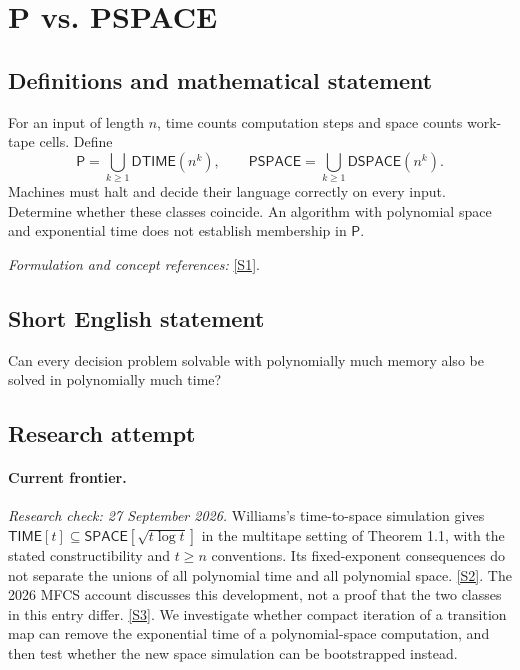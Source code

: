\documentclass[11pt,a4paper]{article}
\newcommand{\sref}[2]{\hyperlink{source:#1:#2}{[S#2]}}
\newif\ifshowcatalogue
\newcommand{\cataloguescope}[1]{\ifshowcatalogue
 \paragraph{Exact scope in the supplied catalogue.}
 \begin{quote}\small #1\end{quote}\fi}
\begin{document}
\setcounter{section}{0}
\clearpage
\section*{\texorpdfstring{P vs. PSPACE}{P vs. PSPACE}}\label{3402}
\subsection{Definitions and mathematical statement}
For an input of length $n$, time counts computation steps and space counts work-tape cells. Define
\[
 \mathsf P=\bigcup_{k\ge1}\mathsf{DTIME}(n^k),\qquad
 \mathsf{PSPACE}=\bigcup_{k\ge1}\mathsf{DSPACE}(n^k).
\]
Machines must halt and decide their language correctly on every input. Determine whether these classes coincide. An algorithm with polynomial space and exponential time does not establish membership in $\mathsf P$.
\par\smallskip\textit{Formulation and concept references:} \sref{3402}{1}.
\cataloguescope{Determine whether P = PSPACE, that is, whether every language decidable by a deterministic Turing machine in polynomial space is decidable by a deterministic Turing machine in polynomial time.}
\subsection{Short English statement}
Can every decision problem solvable with polynomially much memory also be solved in polynomially much time?
\subsection{Research attempt}
\paragraph{Current frontier.}
\textit{Research check: 27 September 2026.}
Williams's time-to-space simulation gives
$\mathsf{TIME}[t]\subseteq\mathsf{SPACE}[\sqrt{t\log t}]$ in the
multitape setting of Theorem 1.1, with the stated constructibility and
$t\geq n$ conventions. Its fixed-exponent consequences do not separate
the unions of all polynomial time and all polynomial space.
\sref{3402}{2}. The 2026 MFCS account discusses this development, not a
proof that the two classes in this entry differ. \sref{3402}{3}.
We investigate whether compact iteration of a transition map can remove
the exponential time of a polynomial-space computation, and then test
whether the new space simulation can be bootstrapped instead.
\end{document}
